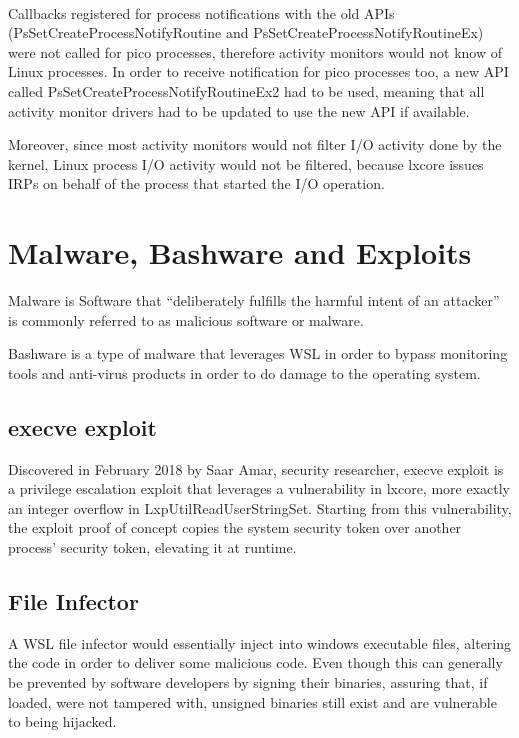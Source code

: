             \paragraph{}
            Callbacks registered for process notifications with the old APIs (PsSetCreateProcessNotifyRoutine and
            PsSetCreateProcessNotifyRoutineEx) were not called for pico processes, therefore activity monitors would not know of Linux processes.
            In order to receive notification for pico processes too, a new API called PsSetCreateProcessNotifyRoutineEx2 had to be used, meaning
            that all activity monitor drivers had to be updated to use the new API if available.

            Moreover, since most activity monitors would not filter I/O activity done by the kernel, Linux process I/O activity would not be
            filtered, because lxcore issues IRPs on behalf of the process that started the I/O operation.

    \section{Malware, Bashware and Exploits}
        Malware is Software that “deliberately fulfills the harmful intent of an attacker” is commonly referred to as malicious software or
        malware\cite{ieeeproc2007}.

        Bashware is a type of malware that leverages WSL in order to bypass monitoring tools and anti-virus products in order to do damage to the
        operating system.
        
        \subsection{execve exploit}
            Discovered in February 2018 by Saar Amar, security researcher, execve exploit\cite{execve} is a privilege escalation exploit that
            leverages a vulnerability in lxcore, more exactly an integer overflow in LxpUtilReadUserStringSet. Starting from this vulnerability,
            the exploit proof of concept copies the system security token over another process' security token, elevating it at runtime.

        \subsection{File Infector}
            A WSL file infector would essentially inject into windows executable files, altering the code in order to deliver some malicious
            code. Even though this can generally be prevented by software developers by signing their binaries, assuring that, if loaded, were
            not tampered with, unsigned binaries still exist and are vulnerable to being hijacked.
            
